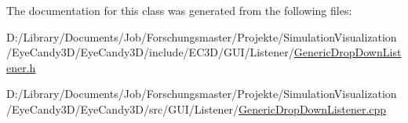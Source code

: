 The documentation for this class was generated from the following files\+:\begin{DoxyCompactItemize}
\item 
D\+:/\+Library/\+Documents/\+Job/\+Forschungsmaster/\+Projekte/\+Simulation\+Visualization/\+Eye\+Candy3\+D/\+Eye\+Candy3\+D/include/\+E\+C3\+D/\+G\+U\+I/\+Listener/\mbox{\hyperlink{_generic_drop_down_listener_8h}{Generic\+Drop\+Down\+Listener.\+h}}\item 
D\+:/\+Library/\+Documents/\+Job/\+Forschungsmaster/\+Projekte/\+Simulation\+Visualization/\+Eye\+Candy3\+D/\+Eye\+Candy3\+D/src/\+G\+U\+I/\+Listener/\mbox{\hyperlink{_generic_drop_down_listener_8cpp}{Generic\+Drop\+Down\+Listener.\+cpp}}\end{DoxyCompactItemize}
